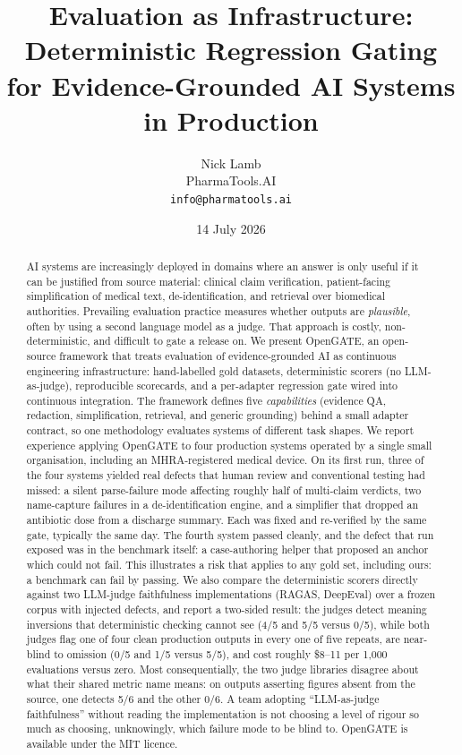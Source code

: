 \documentclass[11pt,a4paper]{article}
\title{\textbf{Evaluation as Infrastructure:}\\
Deterministic Regression Gating for Evidence-Grounded AI Systems in Production}
\author{Nick Lamb\\
\small PharmaTools.AI\\
\small \texttt{info@pharmatools.ai}}
\date{14 July 2026}
\begin{document}
\maketitle

\begin{abstract}
\noindent
AI systems are increasingly deployed in domains where an answer is only useful if it can be
justified from source material: clinical claim verification, patient-facing simplification of
medical text, de-identification, and retrieval over biomedical authorities. Prevailing evaluation
practice measures whether outputs are \emph{plausible}, often by using a second language model as a
judge. That approach is costly, non-deterministic, and difficult to gate a release on. We present
OpenGATE, an open-source framework that treats evaluation of evidence-grounded AI as continuous
engineering infrastructure: hand-labelled gold datasets, deterministic scorers (no LLM-as-judge),
reproducible scorecards, and a per-adapter regression gate wired into continuous integration. The
framework defines five \emph{capabilities} (evidence QA, redaction, simplification, retrieval,
and generic grounding) behind a small adapter contract, so one methodology evaluates systems of
different task shapes. We report experience applying OpenGATE to four production systems operated by
a single small organisation, including an MHRA-registered medical device. On its first run, three of
the four systems yielded real defects that human review and conventional testing had missed: a
silent parse-failure mode affecting roughly half of multi-claim verdicts, two name-capture failures
in a de-identification engine, and a simplifier that dropped an antibiotic dose from a discharge
summary. Each was fixed and re-verified by the same gate, typically the same day. The fourth system
passed cleanly, and the defect that run exposed was in the benchmark itself: a case-authoring
helper that proposed an anchor which could not fail. This illustrates a risk that applies to any gold
set, including ours: a benchmark can fail by passing. We also compare the deterministic
scorers directly against two LLM-judge faithfulness implementations (RAGAS, DeepEval) over a frozen
corpus with injected defects, and report a two-sided result: the judges detect meaning inversions
that deterministic checking cannot see (4/5 and 5/5 versus 0/5), while both judges flag one of four
clean production outputs in every one of five repeats, are near-blind to omission (0/5 and 1/5 versus
5/5), and cost roughly \$8--11 per 1{,}000 evaluations versus zero. Most consequentially, the two
judge libraries disagree about what their shared metric name means: on outputs asserting figures
absent from the source, one detects 5/6 and the other 0/6. A team adopting ``LLM-as-judge
faithfulness'' without reading the implementation is not choosing a level of rigour so much as
choosing, unknowingly, which failure mode to be blind to. OpenGATE is available under the MIT licence.
\end{abstract}
\end{document}
